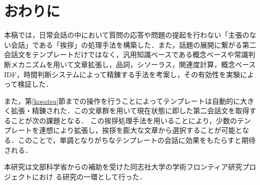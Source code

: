 \section{おわりに}

本稿では，日常会話の中において質問の応答や問題の提起を行わない「主張のない会話」である「挨拶」の処理手法を構築した．また，話題の展開に繋がる第二会話文をテンプレートだけではなく，汎用知識ベースである概念ベースや常識判断メカニズムを用いて文章拡張し，品詞，シソーラス，関連度計算，概念ベースIDF，時間判断システムによって精錬する手法を考案し，その有効性を実験によって検証した．

また，第\ref{kosatsu}節までの操作を行うことによってテンプレートは自動的に大きく拡張・精錬された．この文章群を用いて現在状態に即した第二会話文を取得することが次の課題となる．
この挨拶処理手法を用いることにより，少数のテンプレートを連想により拡張し，挨拶を膨大な文章から選択することが可能となる．このことで，単調となりがちなテンプレートの会話に効果をもたらすと期待される．


\acknowledgment
本研究は文部科学省からの補助を受けた同志社大学の学術フロンティア研究プロジェクトにおけ
る研究の一環として行った．




